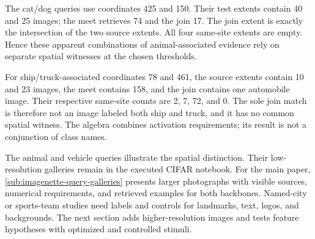 The cat/dog queries use coordinates
425 and 150. Their test extents contain 40 and 25 images; the meet
retrieves 74 and the join 17. The join extent is exactly the intersection
of the two source extents. All four same-site extents are empty. Hence
these apparent combinations of animal-associated evidence rely on
separate spatial witnesses at the chosen thresholds.

For ship/truck-associated coordinates 78 and 461, the source extents
contain 10 and 23 images, the meet contains 158, and the join contains
one automobile image. Their respective same-site counts are 2, 7, 72,
and 0. The sole join match is therefore not an image labeled both ship
and truck, and it has no common spatial witness. The algebra combines
activation requirements; its result is not a conjunction of class names.

The animal and vehicle queries illustrate the spatial distinction.
Their low-resolution galleries remain in the executed CIFAR notebook.
For the main paper, \cref{sub:imagenette-query-galleries} presents
larger photographs with visible sources, numerical requirements, and
retrieved examples for both backbones.
Named-city or sports-team studies need labels and controls for landmarks,
text, logos, and backgrounds. The next section adds higher-resolution
images and tests feature hypotheses with optimized and controlled stimuli.

\clearpage
